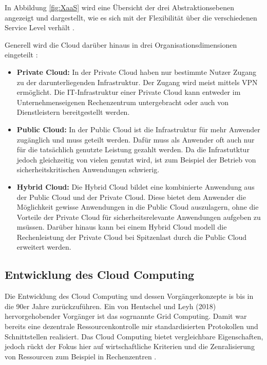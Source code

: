 In Abbildung \ref{fig:XaaS} wird eine Übersicht der drei Abstraktionsebenen angezeigt und dargestellt, wie es sich mit der Flexibilität über die verschiedenen
Service Level verhält \cite[Vgl.][S. 33]{Maenhaut2016}.

Generell wird die Cloud darüber hinaus in drei Organisationsdimensionen eingeteilt \cite[Vgl.][S. 7ff]{Reinheimer2018}:
\begin{itemize}
\item \textbf{Private Cloud:} In der Private Cloud haben nur bestimmte Nutzer Zugang zu der darunterliegenden Infrastruktur. Der Zugang wird meist mittels
\acf{VPN} ermöglicht. Die IT-Infrastruktur einer Private Cloud kann entweder im Unternehmenseigenen Rechenzentrum untergebracht oder auch
von Dienstleistern bereitgestellt werden.
\item \textbf{Public Cloud:} In der Public Cloud ist die Infrastruktur für mehr Anwender zugänglich und muss geteilt werden. Dafür muss als Anwender oft
auch nur für die tatsächlich genutzte Leistung gezahlt werden. Da die Infrastutktur jedoch gleichzeitig von vielen genutzt wird, ist zum Beispiel der
Betrieb von sicherheitskritischen Anwendungen schwierig.
\item \textbf{Hybrid Cloud:} Die Hybrid Cloud bildet eine kombinierte Anwendung aus der Public Cloud und der Private Cloud. Diese bietet dem Anwender die
Möglichkeit gewisse Anwendungen in die Public Cloud auszulagern, ohne die Vorteile der Private Cloud für sicherheitsrelevante Anwendungen aufgeben zu msüssen.
Darüber hinaus kann bei einem Hybrid Cloud modell die Rechenleistung der Private Cloud bei Spitzenlast durch die Public Cloud erweitert werden. 
\end{itemize}

\pagebreak

\subsection{Entwicklung des Cloud Computing}

Die Entwicklung des Cloud Computing und dessen Vorgängerkonzepte is bis in die 90er Jahre zurückzuführen.
Ein von Hentschel und Leyh (2018) hervorgehobender Vorgänger ist das sogrnannte Grid Computing.
Damit war bereits eine dezentrale Ressourcenkontrolle mir standardisierten Protokollen und
Schnittstellen realisiert. Das Cloud Computing bietet vergleichbare Eigenschaften, jedoch rückt der
Fokus hier auf wirtschaftliche Kriterien und die Zenralisierung von Ressourcen zum Beispiel in
Rechenzentren \cite[Vgl.][S. 5f]{Reinheimer2018}.


